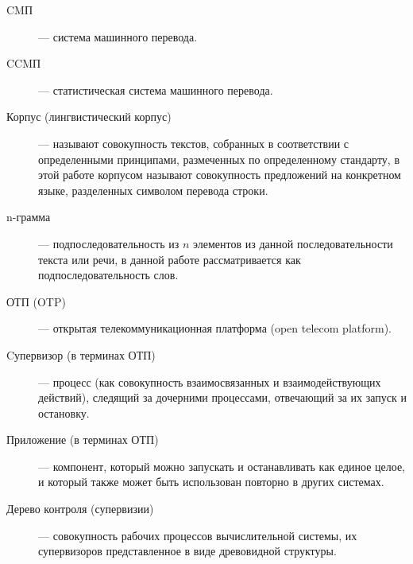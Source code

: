 

\begin{description}
	\item[CMП] --- система машинного перевода.
	\item[CCMП] --- статистическая система машинного перевода.
	\item[Корпус (лингвистический корпус)] --- называют совокупность текстов, собранных в соответствии с определенными принципами, размеченных по определенному стандарту, в этой работе корпусом называют совокупность предложений на конкретном языке,
	разделенных символом перевода строки.
	\item[n-грамма] --- подпоследовательность из $n$ элементов из данной последовательности текста или речи, в данной работе рассматривается как подпоследовательность слов.
	\item[ОТП (OTP)] --- открытая телекоммуникационная платформа (open telecom platform).
	\item[Cупервизор (в терминах ОТП)] --- процесс (как совокупность взаимосвязанных и взаимодействующих действий),
		следящий за дочерними процессами, отвечающий за их запуск и остановку.
	\item[Приложение (в терминах ОТП)] --- компонент, который можно запускать и останавливать как единое целое, и который также может быть использован повторно в других системах. 
	\item[Дерево контроля (супервизии)] --- совокупность рабочих процессов вычислительной системы, их супервизоров представленное в виде древовидной структуры.
\end{description}

\pagebreak

